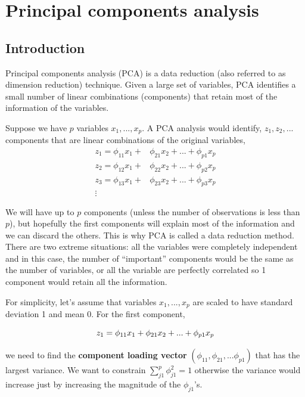 \documentclass[
]{book}
\begin{document}
\chapter{Principal components analysis}\label{principal-components-analysis}

\section{Introduction}\label{PCA1}

Principal components analysis (PCA) is a data reduction (also referred to as
dimension reduction) technique. Given a
large set of variables, PCA identifies a small number of linear combinations
(components) that retain most of the information of the variables.

Suppose we have \(p\) variables \(x_1,...,x_p\). A PCA analysis would identify,
\(z_1,z_2,...\) components that are linear combinations of the original variables,
\[
\begin{aligned}
z_1 = \phi_{11}x_1 + &\phi_{21}x_2 +... + \phi_{p1}x_p\\
z_2 = \phi_{12}x_1 + &\phi_{22}x_2 +... + \phi_{p2}x_p\\
z_3 = \phi_{13}x_1 + &\phi_{23}x_2 +... + \phi_{p3}x_p\\
\vdots
\end{aligned}
\]

We will have up to \(p\) components (unless the number of observations is less
than \(p\)), but hopefully the first components will explain most of the
information and we can discard the others. This is why PCA is called a data
reduction method. There are two extreme situations: all the variables were
completely independent and in this case, the number of ``important'' components
would be the same as the number of variables, or all the variable are
perfectly correlated so 1 component would retain all the information.

For simplicity, let's assume that variables \(x_1,...,x_p\) are scaled to have
standard deviation 1 and mean 0. For the first component,

\[
z_1 = \phi_{11}x_1 + \phi_{21}x_2 +... + \phi_{p1}x_p\\
\]

we need to find the
\textbf{component loading vector} \((\phi_{11}, \phi_{21},... \phi_{p1})\) that
has the largest variance. We want to constrain \(\sum_{j1}^{p}{\phi^2_{j1}=1}\)
otherwise the variance would increase just by increasing the magnitude of the
\(\phi_{j1}\)'s.
\end{document}

